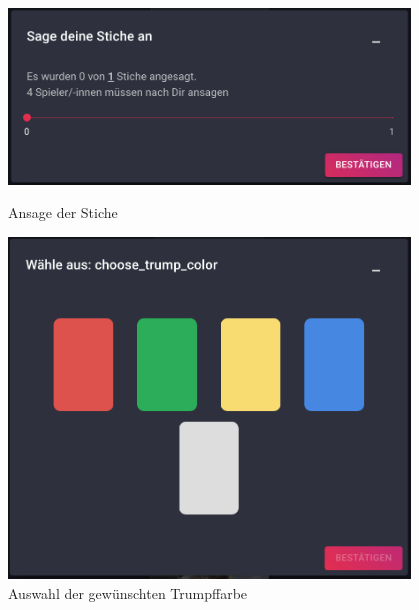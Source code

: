 \begin{figure}[h]
	\begin{minipage}{0.5\textwidth}
		\centering
		\includegraphics[width=0.95\textwidth]{images/trick-selection.png}
		\caption{Ansage der Stiche}
		\label{fig:trick-selection}
	\end{minipage}
	\begin{minipage}{0.5\textwidth}
		\centering
		\includegraphics[width=0.95\textwidth]{images/trick-color-selection.png}
		\caption{Auswahl der gewünschten Trumpffarbe}
		\label{fig:trick-color-selection}
	\end{minipage}
\end{figure}

